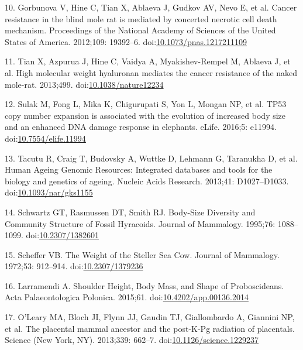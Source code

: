 \documentclass[]{elsarticle} %
\begin{document}
\leavevmode\hypertarget{ref-Gorbunova2012}{}%
10. Gorbunova V, Hine C, Tian X, Ablaeva J, Gudkov AV, Nevo E, et al.
Cancer resistance in the blind mole rat is mediated by concerted
necrotic cell death mechanism. Proceedings of the National Academy of
Sciences of the United States of America. 2012;109: 19392--6.
doi:\href{https://doi.org/10.1073/pnas.1217211109}{10.1073/pnas.1217211109}

\leavevmode\hypertarget{ref-Tian2013}{}%
11. Tian X, Azpurua J, Hine C, Vaidya A, Myakishev-Rempel M, Ablaeva J,
et al. High molecular weight hyaluronan mediates the cancer resistance
of the naked mole-rat. 2013;499.
doi:\href{https://doi.org/10.1038/nature12234}{10.1038/nature12234}

\leavevmode\hypertarget{ref-Sulak2015}{}%
12. Sulak M, Fong L, Mika K, Chigurupati S, Yon L, Mongan NP, et al.
TP53 copy number expansion is associated with the evolution of increased
body size and an enhanced DNA damage response in elephants. eLife.
2016;5: e11994.
doi:\href{https://doi.org/10.7554/elife.11994}{10.7554/elife.11994}

\leavevmode\hypertarget{ref-HAGR}{}%
13. Tacutu R, Craig T, Budovsky A, Wuttke D, Lehmann G, Taranukha D, et
al. Human Ageing Genomic Resources: Integrated databases and tools for
the biology and genetics of ageing. Nucleic Acids Research. 2013;41:
D1027--D1033.
doi:\href{https://doi.org/10.1093/nar/gks1155}{10.1093/nar/gks1155}

\leavevmode\hypertarget{ref-Schwartz1995}{}%
14. Schwartz GT, Rasmussen DT, Smith RJ. Body-Size Diversity and
Community Structure of Fossil Hyracoids. Journal of Mammalogy. 1995;76:
1088--1099. doi:\href{https://doi.org/10.2307/1382601}{10.2307/1382601}

\leavevmode\hypertarget{ref-Scheffer1972}{}%
15. Scheffer VB. The Weight of the Steller Sea Cow. Journal of
Mammalogy. 1972;53: 912--914.
doi:\href{https://doi.org/10.2307/1379236}{10.2307/1379236}

\leavevmode\hypertarget{ref-Larramendi:20151c2}{}%
16. Larramendi A. Shoulder Height, Body Mass, and Shape of
Proboscideans. Acta Palaeontologica Polonica. 2015;61.
doi:\href{https://doi.org/10.4202/app.00136.2014}{10.4202/app.00136.2014}

\leavevmode\hypertarget{ref-OLeary2013a}{}%
17. O'Leary MA, Bloch JI, Flynn JJ, Gaudin TJ, Giallombardo A, Giannini
NP, et al. The placental mammal ancestor and the post-K-Pg radiation of
placentals. Science (New York, NY). 2013;339: 662--7.
doi:\href{https://doi.org/10.1126/science.1229237}{10.1126/science.1229237}
\end{document}
